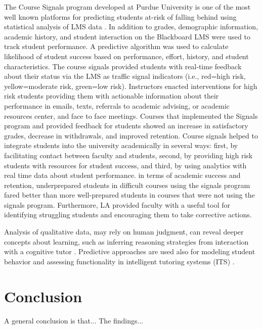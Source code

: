 \documentclass[sigconf]{acmart}
\begin{document}
The Course Signals program developed at Purdue University 
is one of the most well known platforms for predicting students at-risk of 
falling behind using statistical analysis of LMS data \cite{arnoldPistilli12}. 
In addition to grades, demographic information, academic history, and student 
interaction on the Blackboard LMS were used to track student performance. A 
predictive algorithm was used to calculate likelihood of student success based 
on performance, effort, history, and student characteristics. The course signals 
provided students with real-time feedback about their status via the LMS as 
traffic signal indicators (i.e., red=high risk, yellow=moderate risk, green=low 
risk). Instructors enacted interventions for high risk students providing them 
with actionable information about their performance in emails, texts, referrals
to academic advising, or academic resources center, and face to face meetings.
Courses that implemented the Signals program and provided feedback for students
showed an increase in satisfactory grades, decrease in withdrawals, and 
improved retention. Course signals helped to integrate students into the 
university academically in several ways: first, by facilitating contact 
between faculty and students, second, by providing high risk students with 
resources for student success, and third, by using analytics with real time 
data about student performance. in terms of academic success and retention, 
underprepared students in difficult courses using the signals program fared 
better than more well-prepared students in courses that were not using the 
signals program. Furthermore, LA provided faculty with a useful tool for 
identifying struggling students and encouraging them to take corrective actions.  


Analysis of qualitative data, may rely on human judgment, can reveal deeper 
concepts about learning, such as inferring reasoning strategies from interaction 
with a cognitive tutor 
\cite{Fournier11}. Predictive approaches are used also for modeling student 
behavior and assessing functionality in intelligent tutoring systems (ITS)
\cite{penaayala14}. 




\section{Conclusion}

A general conclusion is that... 
The findings...
\end{document}
